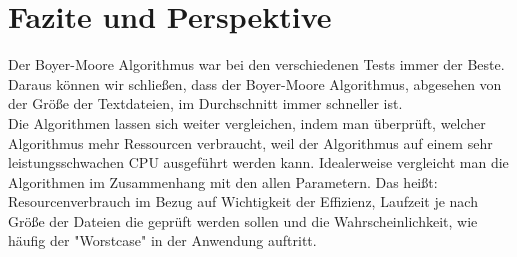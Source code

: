 \documentclass[14pt]{article}
\begin{document}
\section{Fazite und Perspektive}
Der Boyer-Moore Algorithmus war bei den verschiedenen Tests immer der Beste. Daraus können wir schließen, dass  der Boyer-Moore Algorithmus, abgesehen von der Größe der Textdateien, im Durchschnitt immer schneller ist. 
\\

Die Algorithmen lassen sich weiter vergleichen, indem man überprüft, welcher Algorithmus mehr Ressourcen verbraucht, weil der Algorithmus auf einem sehr leistungsschwachen CPU ausgeführt werden kann. Idealerweise vergleicht man die Algorithmen im Zusammenhang mit den allen Parametern. Das heißt: Resourcenverbrauch im Bezug auf Wichtigkeit der Effizienz, Laufzeit je nach Größe der Dateien die geprüft werden sollen und die Wahrscheinlichkeit, wie häufig der "Worstcase" in der Anwendung auftritt. 
\end{document}
